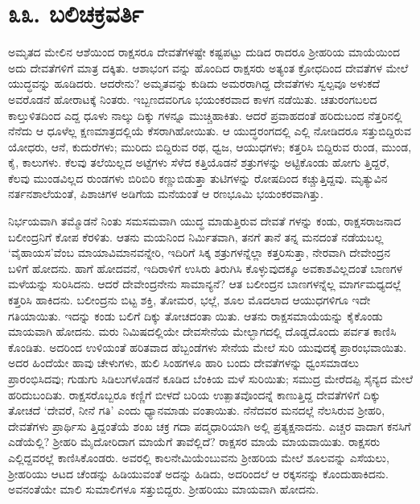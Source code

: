 
\chapter{೩೩. ಬಲಿಚಕ್ರವರ್ತಿ}

ಅಮೃತದ ಮೇಲಿನ ಆಶೆಯಿಂದ ರಾಕ್ಷಸರೂ ದೇವತೆಗಳಷ್ಟೇ ಕಷ್ಟಪಟ್ಟು ದುಡಿದ ರಾದರೂ ಶ್ರೀಹರಿಯ ಮಾಯೆಯಿಂದ ಅದು ದೇವತೆಗಳಿಗೆ ಮಾತ್ರ ದಕ್ಕಿತು. ಆಶಾಭಂಗ ವನ್ನು ಹೊಂದಿದ ರಾಕ್ಷಸರು ಅತ್ಯಂತ ಕ್ರೋಧದಿಂದ ದೇವತೆಗಳ ಮೇಲೆ ಯುದ್ಧವನ್ನು ಹೂಡಿದರು. ಆದರೇನು? ಅಮೃತವನ್ನು ಕುಡಿದು ಅಮರರಾಗಿದ್ದ ದೇವತೆಗಳು ಸ್ವಲ್ಪವೂ ಅಳುಕದೆ ಅವರೊಡನೆ ಹೋರಾಟಕ್ಕೆ ನಿಂತರು. ಇಬ್ಬಣದವರಿಗೂ ಭಯಂಕರವಾದ ಕಾಳಗ ನಡೆಯಿತು. ಚತುರಂಗಬಲದ ಕಾಲ್ತುಳಿತದಿಂದ ಎದ್ದ ಧೂಳು ನಾಲ್ಕು ದಿಕ್ಕು ಗಳನ್ನೂ ಮುಚ್ಚಿಹಾಕಿತು. ಆದರೆ ಪ್ರವಾಹದಂತೆ ಹರಿದುಬಂದ ನೆತ್ತರಿನಲ್ಲಿ ನೆನೆದು ಆ ಧೂಳೆಲ್ಲ ಕ್ಷಣಮಾತ್ರದಲ್ಲಿಯೆ ಕೆಸರಾಗಿಹೋಯಿತು. ಆ ಯುದ್ಧರಂಗದಲ್ಲಿ ಎಲ್ಲಿ ನೋಡಿದರೂ ಸತ್ತುಬಿದ್ದಿರುವ ಯೋಧರು, ಆನೆ, ಕುದುರೆಗಳು; ಮುರಿದು ಬಿದ್ದಿರುವ ರಥ, ಧ್ವಜ, ಆಯುಧಗಳು; ಕತ್ತರಿಸಿ ಬಿದ್ದಿರುವ ರುಂಡ, ಮುಂಡ, ಕೈ, ಕಾಲುಗಳು. ಕೆಲವು ತಲೆಯಿಲ್ಲದ ಅಟ್ಟೆಗಳು ಸೆಳೆದ ಕತ್ತಿಯೊಡನೆ ಶತ್ರುಗಳನ್ನು ಅಟ್ಟಿಕೊಂಡು ಹೋಗು ತ್ತಿದ್ದರೆ, ಕೆಲವು ಮುಂಡವಿಲ್ಲದ ರುಂಡಗಳು ಬಿರಿಬಿರಿ ಕಣ್ಣುಬಿಡುತ್ತಾ ತುಟಿಗಳನ್ನು ರೋಷದಿಂದ ಕಚ್ಚುತ್ತಿದ್ದವು. ಮೃತ್ಯುವಿನ ನರ್ತನಶಾಲೆಯಂತೆ, ಪಿಶಾಚಿಗಳ ಅಡಿಗೆಯ ಮನೆಯಂತೆ ಆ ರಣಭೂಮಿ ಭಯಂಕರವಾಗಿತ್ತು.

ನಿರ್ಭಯವಾಗಿ ತಮ್ಮೊಡನೆ ನಿಂತು ಸಮಸಮವಾಗಿ ಯುದ್ಧ ಮಾಡುತ್ತಿರುವ ದೇವತೆ ಗಳನ್ನು ಕಂಡು, ರಾಕ್ಷಸರಾಜನಾದ ಬಲೀಂದ್ರನಿಗೆ ಕೋಪ ಕೆರಳಿತು. ಆತನು ಮಯನಿಂದ ನಿರ್ಮಿತವಾಗಿ, ತನಗೆ ತಾನೆ ತನ್ನ ಮನದಂತೆ ನಡೆಯಬಲ್ಲ ‘ವೈಹಾಯಸ’ವೆಂಬ ಮಾಯಾವಿಮಾನವನ್ನೇರಿ, ಇದಿರಿಗೆ ಸಿಕ್ಕ ಶತ್ರುಗಳನ್ನೆಲ್ಲಾ ಕತ್ತರಿಸುತ್ತಾ, ನೇರವಾಗಿ ದೇವೇಂದ್ರನ ಬಳಿಗೆ ಹೋದನು. ಹಾಗೆ ಹೋದವನೆ, ಇದಿರಾಳಿಗೆ ಉಸಿರು ತಿರುಗಿಸಿ ಕೊಳ್ಳುವುದಕ್ಕೂ ಅವಕಾಶವಿಲ್ಲದಂತೆ ಬಾಣಗಳ ಮಳೆಯನ್ನು ಸುರಿಸಿದನು. ಆದರೆ ದೇವೇಂದ್ರನೇನು ಸಾಮಾನ್ಯನೆ? ಆತ ಬಲೀಂದ್ರನ ಬಾಣಗಳನ್ನೆಲ್ಲ ಮಾರ್ಗಮಧ್ಯದಲ್ಲೆ ಕತ್ತರಿಸಿ ಹಾಕಿದನು. ಬಲೀಂದ್ರನು ಬಿಟ್ಟ ಶಕ್ತಿ, ತೋಮರ, ಭಲ್ಲೆ, ಶೂಲ ಮೊದಲಾದ ಆಯುಧಗಳಿಗೂ ಇದೇ ಗತಿಯಾಯಿತು. ಇದನ್ನು ಕಂಡು ಬಲಿಗೆ ದಿಕ್ಕು ತೋಚದಂತಾ ಯಿತು. ಆತನು ರಾಕ್ಷಸಮಾಯೆಯನ್ನು ಕೈಕೊಂಡು ಮಾಯವಾಗಿ ಹೋದನು. ಮರು ನಿಮಿಷದಲ್ಲಿಯೇ ದೇವಸೇನೆಯ ಮೇಲ್ಭಾಗದಲ್ಲಿ ದೊಡ್ಡದೊಂದು ಪರ್ವತ ಕಾಣಿಸಿ ಕೊಂಡಿತು. ಅದರಿಂದ ಉಳಿಯಂತೆ ಹರಿತವಾದ ಹೆಬ್ಬಂಡೆಗಳು ಸೇನೆಯ ಮೇಲೆ ಸುರಿ ಯುವುದಕ್ಕೆ ಪ್ರಾರಂಭವಾಯಿತು. ಅದರ ಹಿಂದೆಯೇ ಹಾವು ಚೇಳುಗಳು, ಹುಲಿ ಸಿಂಹಗಳೂ ಹಾರಿ ಬಂದು ದೇವತೆಗಳನ್ನು ಧ್ವಂಸಮಾಡಲು ಪ್ರಾರಂಭಿಸಿದವು; ಗುಡುಗು ಸಿಡಿಲುಗಳೊಡನೆ ಕೂಡಿದ ಬೆಂಕಿಯ ಮಳೆ ಸುರಿಯಿತು; ಸಮುದ್ರ ಮೇರೆದಪ್ಪಿ ಸೈನ್ಯದ ಮೇಲೆ ಹರಿದುಬಂದಿತು. ರಾಕ್ಷಸರೊಬ್ಬರೂ ಕಣ್ಣಿಗೆ ಬೀಳದೆ ಬರಿಯ ಉತ್ಪಾತವೊಂದನ್ನೆ ಕಾಣುತ್ತಿದ್ದ ದೇವತೆಗಳಿಗೆ ದಿಕ್ಕು ತೋಚದೆ ‘ದೇವರೆ, ನೀನೆ ಗತಿ’ ಎಂದು ಧ್ಯಾನಮಾಡು ವಂತಾಯಿತು. ನೆನೆದವರ ಮನದಲ್ಲೆ ನೆಲಸಿರುವ ಶ್ರೀಹರಿ, ದೇವತೆಗಳು ಪ್ರಾರ್ಥಿಸು ತ್ತಿದ್ದಂತೆಯೆ ಶಂಖ ಚಕ್ರ ಗದಾ ಪದ್ಮಧಾರಿಯಾಗಿ ಅಲ್ಲಿ ಪ್ರತ್ಯಕ್ಷನಾದನು. ಎಚ್ಚರ ವಾದಾಗ ಕನಸಿಗೆ ಎಡೆಯೆಲ್ಲಿ? ಶ್ರೀಹರಿ ಮೈದೋರಿದಾಗ ಮಾಯೆಗೆ ತಾವೆಲ್ಲಿದೆ? ರಾಕ್ಷಸರ ಮಾಯೆ ಮಾಯವಾಯಿತು. ರಾಕ್ಷಸರು ಎಲ್ಲಿದ್ದವರಲ್ಲೆ ಕಾಣಿಸಿಕೊಂಡರು. ಅವರಲ್ಲಿ ಕಾಲನೇಮಿಯೆಂಬುವನು ಶ್ರೀಹರಿಯ ಮೇಲೆ ಶೂಲವನ್ನು ಎಸೆಯಲು, ಶ್ರೀಹರಿಯು ಆಟದ ಚೆಂಡನ್ನು ಹಿಡಿಯುವಂತೆ ಅದನ್ನು ಹಿಡಿದು, ಅದರಿಂದಲೆ ಆ ರಕ್ಕಸನನ್ನು ಕೊಂದುಹಾಕಿದನು. ಅವನಂತೆಯೇ ಮಾಲಿ ಸುಮಾಲಿಗಳೂ ಸತ್ತುಬಿದ್ದರು. ಶ್ರೀಹರಿಯು ಮಾಯವಾಗಿ ಹೋದನು.

